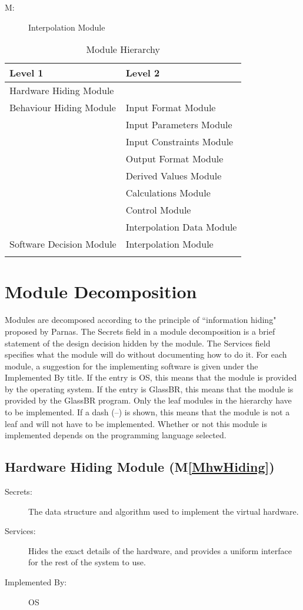 \documentclass[12pt]{article}
\newcounter{modnum}
\newcommand{\mthemodnum}{M\themodnum}
\begin{document}
\begin{description}
\item[\mthemodnum\label{MmodInterpolation}:]Interpolation Module
\end{description}
\begin{longtable}{l l}
\toprule
Level 1 & Level 2
\\
\midrule
Hardware Hiding Module & 
\\
Behaviour Hiding Module & Input Format Module
\\
 & Input Parameters Module
\\
 & Input Constraints Module
\\
 & Output Format Module
\\
 & Derived Values Module
\\
 & Calculations Module
\\
 & Control Module
\\
 & Interpolation Data Module
\\
Software Decision Module & Interpolation Module
\\
\bottomrule
\caption{Module Hierarchy}
\label{Table:ModuHier}
\end{longtable}
\section{Module Decomposition}
\label{Sec:ModuDeco}
Modules are decomposed according to the principle of ``information hiding" proposed by Parnas. The Secrets field in a module decomposition is a brief statement of the design decision hidden by the module. The Services field specifies what the module will do without documenting how to do it. For each module, a suggestion for the implementing software is given under the Implemented By title. If the entry is OS, this means that the module is provided by the operating system. If the entry is GlassBR, this means that the module is provided by the GlassBR program. Only the leaf modules in the hierarchy have to be implemented. If a dash (--) is shown, this means that the module is not a leaf and will not have to be implemented. Whether or not this module is implemented depends on the programming language selected.
\subsection{Hardware Hiding Module (M\ref{MhwHiding})}
\label{Sec:HardHidiModu()}
\begin{description}
\item[Secrets:]The data structure and algorithm used to implement the virtual hardware.
\item[Services:]Hides the exact details of the hardware, and provides a uniform interface for the rest of the system to use.
\item[Implemented By:]OS
\end{description}
\end{document}
